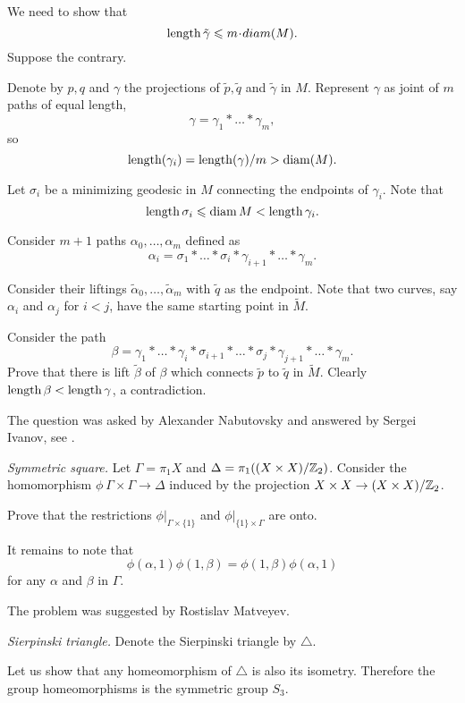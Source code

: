 We need to show that 
\[\length \tilde\gamma\le m\cdot diam(M).\]
Suppose the contrary.

Denote by $p,q$ and $\gamma$ the projections of $\tilde p,\tilde q$ and $\tilde \gamma$ in $M$. 
Represent $\gamma$
as joint of $m$ paths of equal length,
\[\gamma=\gamma_1{*}\dots{*}\gamma_m,\] 
so
\[\operatorname{\rm length}(\gamma_i)=\operatorname{\rm length}(\gamma)/m>\operatorname{\rm diam}(M).\] 

Let $\sigma_i$ be a minimizing geodesic in $M$ connecting the endpoints of $\gamma_i$. 
Note that 
\[\operatorname{\rm length}\sigma_i\leqslant \operatorname{\rm diam} M< \operatorname{\rm length}\gamma_i.\] 

Consider $m+1$ paths $\alpha_0,\dots,\alpha_m$ defined as 
\[\alpha_i=\sigma_1{*}\dots{*}\sigma_i{*}\gamma_{i+1}{*}\dots{*}\gamma_m.\]

Consider their liftings $\tilde\alpha_0,\dots,\tilde\alpha_m$ 
with $\tilde q$ as the endpoint.
Note that two curves, say $\alpha_i$ and $\alpha_j$ for $i<j$, 
have the same starting point in $\tilde M$.

Consider the path
\[\beta=\gamma_1{*}\dots{*}\gamma_i{*}\sigma_{i+1}{*}\dots{*}\sigma_j{*}\gamma_{j+1}{*}\dots{*}\gamma_m.\]
Prove that there is lift $\tilde\beta$ of $\beta$ 
which connects $\tilde p$ to $\tilde q$ in $\tilde M$.
Clearly $\operatorname{\rm length} \beta<\operatorname{\rm length} \gamma$, a contradiction.

The question was asked by Alexander  Nabutovsky
and answered by Sergei Ivanov, 
see \cite{ivanov}.



\textit{Symmetric square.}
Let $\Gamma=\pi_1 X$ and $\Delta=\pi_1((X\times X)/\mathbb{Z}_2)$.
Consider the homomorphism $\phi\:\Gamma\times \Gamma\to \Delta$
induced by the projection $X\times X\to (X\times X)/\mathbb{Z}_2$.

Prove that the restrictions $\phi|_{\Gamma\times \{1\}}$ and $\phi|_{\{1\}\times\Gamma}$
are onto.

It remains to note that 
$$\phi(\alpha,1)\phi(1,\beta)=\phi(1,\beta)\phi(\alpha,1)$$
for any $\alpha$ and $\beta$ in $\Gamma$.

 The problem was suggested by Rostislav Matveyev.



\textit{Sierpinski triangle.}
Denote the Sierpinski triangle by $\triangle$.

Let us show that any homeomorphism of $\triangle$ is also its isometry.
Therefore the group homeomorphisms is the symmetric group $S_3$. 

